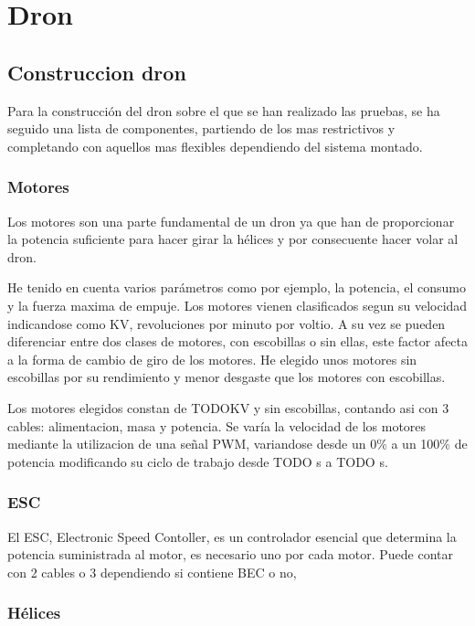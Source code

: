 \documentclass[spanish]{book}
\begin{document}
            
        
        \section{Dron}
            \subsection{Construccion dron}
            Para la construcción del dron sobre el que se han realizado las pruebas, se ha seguido una lista de componentes, partiendo de los mas restrictivos y completando con aquellos mas flexibles dependiendo del sistema montado.
                \subsubsection{Motores}
                Los motores son una parte fundamental de un dron ya que han de proporcionar la potencia suficiente para hacer girar la hélices y por consecuente hacer volar al dron. 
                
                He tenido en cuenta varios parámetros como por ejemplo, la potencia, el consumo y la fuerza maxima de empuje. Los motores vienen clasificados segun su velocidad indicandose como KV, revoluciones por minuto por voltio. A su vez se pueden diferenciar entre dos clases de motores, con escobillas o sin ellas, este factor afecta a la forma de cambio de giro de los motores. He elegido unos motores sin escobillas por su rendimiento y menor desgaste que los motores con escobillas. 
                
                Los motores elegidos constan de TODOKV y sin escobillas, contando asi con 3 cables: alimentacion, masa y potencia. Se varía la velocidad de los motores mediante la utilizacion de una señal PWM, variandose desde un 0\% a un 100\% de potencia modificando su ciclo de trabajo desde TODO s a TODO s.
                \subsubsection{ESC}
                El ESC, Electronic Speed Contoller, es un controlador esencial que determina la potencia suministrada al motor, es necesario uno por cada motor. Puede contar con 2 cables o 3 dependiendo si contiene BEC o no, 
                \subsubsection{Hélices}
\end{document}
